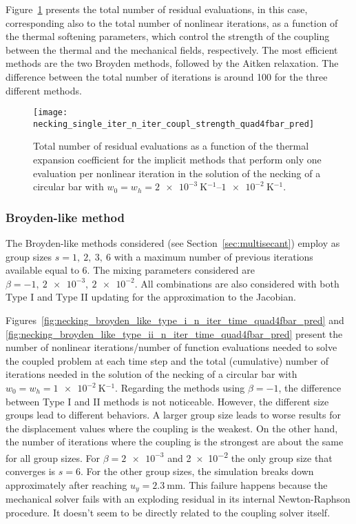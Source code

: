 Figure~\ref{fig:necking_single_iter_n_iter_coupl_strength_quad4fbar_pred} presents the total number of residual evaluations, in this case, corresponding also to the total number of nonlinear iterations, as a function of the thermal softening parameters, which control the strength of the coupling between the thermal and the mechanical fields, respectively.
The most efficient methods are the two Broyden methods, followed by the Aitken relaxation.
The difference between the total number of iterations is around 100 for the three different methods.

\begin{figure}[htbp]
 \centering
 \texttt{[image: necking\_single\_iter\_n\_iter\_coupl\_strength\_quad4fbar\_pred]}
 \caption{Total number of residual evaluations as a function of the thermal expansion coefficient for the implicit methods that perform only one evaluation per nonlinear iteration in the solution of the necking of a circular bar with \(w_0=w_h=\SIrange{2e-3}{1e-2}{\kelvin^{-1}}\).}
\label{fig:necking_single_iter_n_iter_coupl_strength_quad4fbar_pred}
\end{figure}

\FloatBarrier

\subsubsection{Broyden-like method}

The Broyden-like methods considered (see Section~\ref{sec:multisecant}) employ as group sizes \(s=1,\ 2,\ 3,\ 6\) with a maximum number of previous iterations available equal to 6.
The mixing parameters considered are \(\beta=-1,\ \num{2e-3},\ \num{2e-2}\).
All combinations are also considered with both Type I and Type II updating for the approximation to the Jacobian.

Figures~\ref{fig:necking_broyden_like_type_i_n_iter_time_quad4fbar_pred} and \ref{fig:necking_broyden_like_type_ii_n_iter_time_quad4fbar_pred} present the number of nonlinear iterations/number of function evaluations needed to solve the coupled problem at each time step and the total (cumulative) number of iterations needed in the solution of the necking of a circular bar with \(w_0=w_h=\SI{1e-2}{\kelvin^{-1}}\).
Regarding the methods using \(\beta=-1\), the difference between Type I and II methods is not noticeable.
However, the different size groups lead to different behaviors.
A larger group size leads to worse results for the displacement values where the coupling is the weakest.
On the other hand, the number of iterations where the coupling is the strongest are about the same for all group sizes.
For \(\beta=\num{2e-3}\) and \num{2e-2} the only group size that converges is \(s=6\).
For the other group sizes, the simulation breaks down approximately after reaching \(u_y=\SI{2.3}{\milli\meter}\).
This failure happens because the mechanical solver fails with an exploding residual in its internal Newton-Raphson procedure.
It doesn't seem to be directly related to the coupling solver itself.

